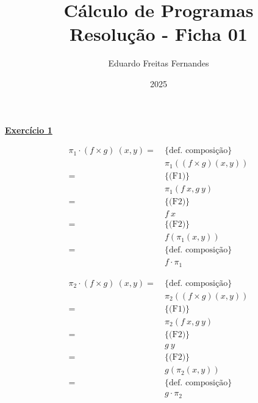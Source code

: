 \documentclass[a4paper,11pt]{article}
\title{Cálculo de Programas \\ Resolução - Ficha 01}
\author{Eduardo Freitas Fernandes}
\date{2025}
\begin{document}
	
\maketitle
	
\noindent \underline{\textbf{Exercício 1}}\\

\begin{minipage}{0.45\textwidth}
\begin{mdframed}
	\[
	\begin{aligned}
		\pi_1 \cdot (f \times g) \  (x, y) 
		= \  &\{\text{def. composição}\}\\
		&\pi_1 ((f \times g) (x, y)) \\
		= \  &\{\text{(F1)}\}\\
		&\pi_1 (f \  x, g \  y) \\
		= \  &\{\text{(F2)}\}\\
		&f \  x \\
		= \  &\{\text{(F2)}\}\\
		&f (\pi_1 (x, y)) \\
		= \  &\{\text{def. composição}\}\\
		&f \cdot \pi_1
	\end{aligned}
	\]
\end{mdframed}	
\end{minipage}
\hfill
\begin{minipage}{0.45\textwidth}
\begin{mdframed}
	\[
	\begin{aligned}
		\pi_2 \cdot (f \times g) \  (x, y) 
		= \  &\{\text{def. composição}\}\\
		&\pi_2 ((f \times g) (x, y)) \\
		= \  &\{\text{(F1)}\}\\
		&\pi_2 (f \  x, g \  y) \\
		= \  &\{\text{(F2)}\}\\
		&g \  y \\
		= \  &\{\text{(F2)}\}\\
		&g (\pi_2 (x, y)) \\
		= \  &\{\text{def. composição}\}\\
		&g \cdot \pi_2
	\end{aligned}
	\]
\end{mdframed}
\end{minipage}
\end{document}
